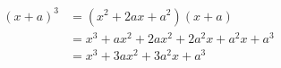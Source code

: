 \documentclass{ltjsarticle}
\begin{document}
\begin{align*}
(x+a)^3 &= (x^2 + 2ax + a^2)(x+a)\\
&= x^3 + ax^2 + 2ax^2 + 2a^2x + a^2x + a^3\\
&= x^3 + 3ax^2 + 3a^2x + a^3
\end{align*}
\end{document}
